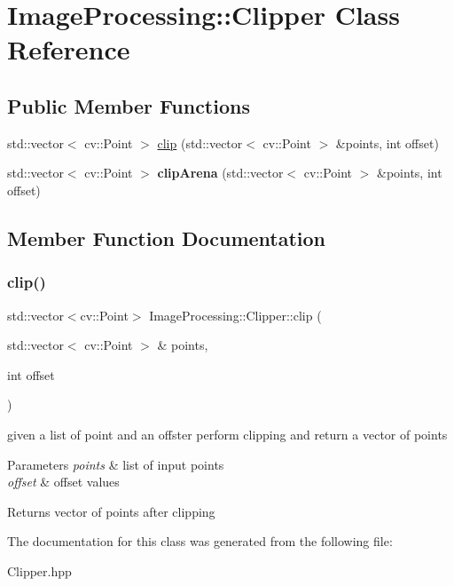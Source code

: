 \hypertarget{class_image_processing_1_1_clipper}{}\section{Image\+Processing\+:\+:Clipper Class Reference}
\label{class_image_processing_1_1_clipper}
\subsection*{Public Member Functions}
\begin{DoxyCompactItemize}
\item 
std\+::vector$<$ cv\+::\+Point $>$ \mbox{\hyperlink{class_image_processing_1_1_clipper_a936e548aa6e5f9be99617c4d3df3e322}{clip}} (std\+::vector$<$ cv\+::\+Point $>$ \&points, int offset)
\item 
\mbox{\label{class_image_processing_1_1_clipper_a8d9c87e875b84b07677f515e11c29fab}} 
std\+::vector$<$ cv\+::\+Point $>$ {\bfseries clip\+Arena} (std\+::vector$<$ cv\+::\+Point $>$ \&points, int offset)
\end{DoxyCompactItemize}


\subsection{Member Function Documentation}
\mbox{\label{class_image_processing_1_1_clipper_a936e548aa6e5f9be99617c4d3df3e322}} 
\subsubsection{\texorpdfstring{clip()}{clip()}}
{\footnotesize\ttfamily std\+::vector$<$cv\+::\+Point$>$ Image\+Processing\+::\+Clipper\+::clip (\begin{DoxyParamCaption}\item[{std\+::vector$<$ cv\+::\+Point $>$ \&}]{points,  }\item[{int}]{offset }\end{DoxyParamCaption})}

given a list of point and an offster perform clipping and return a vector of points 
\begin{DoxyParams}{Parameters}
{\em points} & list of input points \\
\hline
{\em offset} & offset values \\
\hline
\end{DoxyParams}
\begin{DoxyReturn}{Returns}
vector of points after clipping 
\end{DoxyReturn}


The documentation for this class was generated from the following file\+:\begin{DoxyCompactItemize}
\item 
Clipper.\+hpp\end{DoxyCompactItemize}
